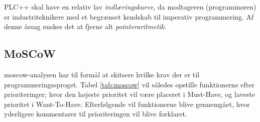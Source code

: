 \noindent PLC++ skal have en relativ lav \textit{indlæringskurve}, da modtageren (programmøren) er industriteknikere med et begrænset kendskab til imperativ programmering. Af denne årsag ønskes det at fjerne alt \textit{pointeraritmetik}.

\subsection{MoSCoW}\label{ssec:moscow}
\gls{moscow}-analysen har til formål at skitsere hvilke krav der er til programmeringssproget. Tabel \ref{tab:moscow} vil således opstille funktionerne efter prioriteringer; hvor den højeste prioritet vil være placeret i Must-Have, og laveste prioritet i Want-To-Have. Efterfølgende vil funktionerne blive gennemgået, hvor yderligere kommentarer til prioriteringen vil blive forklaret.

